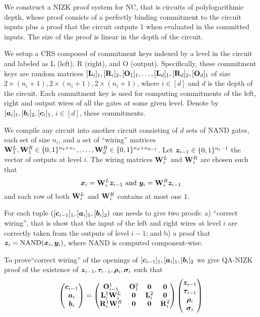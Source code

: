 
We construct a NIZK proof system for NC, that is circuits of polylogarithmic depth, whose proof consists of a perfectly binding commitment to the circuit inputs plus a proof that the circuit outputs 1 when evaluated in the committed inputs. The size of the proof is linear in the depth of the circuit. 

We setup a CRS composed of commitment keys indexed by a level in the circuit and labeled as L (left), R (right), and O (output). Specifically, these commitment keys are random matrices $[\mathbf{{L}}_i]_1,[\mathbf{{R}}_i]_2,[\mathbf{{O}}_1]_1,\ldots,[\mathbf{{L}}_d]_1,[\mathbf{{R}}_d]_2,[\mathbf{{O}}_d]_1$ of size $2\times(n_i+1),2\times(n_i+1),2\times(n_i+1)$, where $i\in[d]$ and $d$ is the depth of the circuit. Each commitment key is used for computing commitments of the left, right and output wires of all the gates at some given level.  Denote by $[{\boldsymbol{a}}_i]_1,[{\boldsymbol{b}}_i]_2,[{\boldsymbol{c}}_i]_1$, $i\in[d]$, these commitments.

We compile any circuit into another circuit consisting of $d$ sets of NAND gates, each set of size $n_i$, and a set of ``wiring'' matrices $\mathbf{{W}}^L_1,\mathbf{{W}}^R_1\in\{0,1\}^{n_2\times n_{1}},\allowbreak,\ldots,\allowbreak\mathbf{{W}}^R_d\in\{0,1\}^{n_d\times n_{d-1}}$. Let ${\boldsymbol{z}}_{i-1}\in\{0,1\}^{n_i-1}$ the vector of outputs at level $i$. The wiring matrices $\mathbf{{W}}^L_i$ and $\mathbf{{W}}^R_i$ are chosen such that
$$
{\boldsymbol{x}}_i = \mathbf{{W}}^L_i{\boldsymbol{z}}_{i-1} \text{ and } {\boldsymbol{y}}_i = \mathbf{{W}}^R_i{\boldsymbol{z}}_{i-1}
$$
and each row of both $\mathbf{{W}}^L_i$ and $\mathbf{{W}}^R_i$ contains at most one $1$.


For each tuple $([{\boldsymbol{c}}_{i-1}]_1,[{\boldsymbol{a}}_i]_1,[{\boldsymbol{b}}_i]_2)$ one needs to give two proofs: a) ``correct wiring'', that is show that the input of the left and right wires at level $i$ are correctly taken from the outputs of level $i-1$; and b) a proof that ${\boldsymbol{z}}_i=\mathrm{NAND}({\boldsymbol{x}}_i,{\boldsymbol{y}}_i)$, where NAND is computed component-wise.

To prove``correct wiring'' of the openings of $[{\boldsymbol{c}}_{i-1}]_1,[{\boldsymbol{a}}_i]_1,[{\boldsymbol{b}}_i]_2$ we give QA-NIZK proof of the existence of ${\boldsymbol{z}}_{i-1},{\boldsymbol{\tau}}_{i-1},{\boldsymbol{\rho}}_i,{\boldsymbol{\sigma}}_i$ such that
$$
\begin{pmatrix}
{\boldsymbol{c}}_{i-1} \\ {\boldsymbol{a}}_i \\ {\boldsymbol{b}}_i
\end{pmatrix}
=
\begin{pmatrix}
\mathbf{{O}}^1_{i-1}  & \mathbf{{O}}^2_1  & {\boldsymbol{0}}       & {\boldsymbol{0}}\\
\mathbf{{L}}^1_i\mathbf{{W}}^L_i         & {\boldsymbol{0}}         & \mathbf{{L}}^2_i & {\boldsymbol{0}} \\
\mathbf{{R}}^1_i\mathbf{{W}}^R_i         & {\boldsymbol{0}}         & {\boldsymbol{0}}      & \mathbf{{R}}^2_i
\end{pmatrix}
\begin{pmatrix}
{\boldsymbol{z}}_{i-1} \\ {\boldsymbol{\tau}}_{i-1} \\ {\boldsymbol{\rho}}_i \\ {\boldsymbol{\sigma}}_i
\end{pmatrix}
$$

